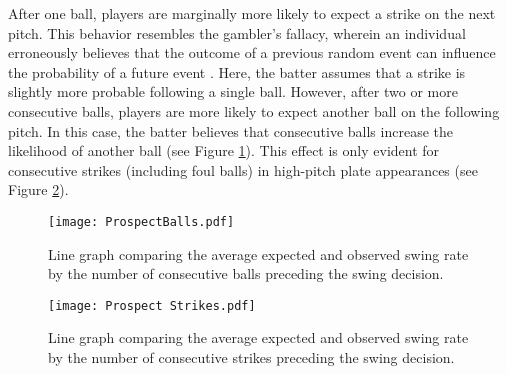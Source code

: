 \documentclass[12pt]{article}
\numberwithin{equation}{section}
\begin{document}
\vspace{5mm} %

After one ball, players are marginally more likely to expect a strike on the next pitch. This behavior resembles the gambler’s fallacy, wherein an individual erroneously believes that the outcome of a previous random event can influence the probability of a future event \parencite{gilovich_hot_1985}. Here, the batter assumes that a strike is slightly more probable following a single ball. However, after two or more consecutive balls, players are more likely to expect another ball on the following pitch. In this case, the batter believes that consecutive balls increase the likelihood of another ball (see Figure \ref{fig:ProspectBalls}). This effect is only evident for consecutive strikes (including foul balls) in high-pitch plate appearances (see Figure \ref{fig:ProspectStrikes}).

\vspace{5mm} %

\begin{figure}[H]
    \centering
    \texttt{[image: ProspectBalls.pdf]}
    \caption{Line graph comparing the average expected and observed swing rate by the number of consecutive balls preceding the swing decision.}
    \label{fig:ProspectBalls}
\end{figure}

\begin{figure}[H]
    \centering
    \texttt{[image: Prospect Strikes.pdf]}
    \caption{Line graph comparing the average expected and observed swing rate by the number of consecutive strikes preceding the swing decision.}
    \label{fig:ProspectStrikes}
\end{figure}
\end{document}

